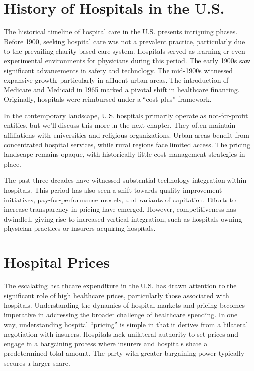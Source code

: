 \documentclass[
  letterpaper,
  DIV=11,
  numbers=noendperiod]{scrreport}
\theoremstyle{definition}
\theoremstyle{remark}
\begin{document}
\hypertarget{history-of-hospitals-in-the-u.s.}{%
\section{History of Hospitals in the
U.S.}\label{history-of-hospitals-in-the-u.s.}}

The historical timeline of hospital care in the U.S. presents intriguing
phases. Before 1900, seeking hospital care was not a prevalent practice,
particularly due to the prevailing charity-based care system. Hospitals
served as learning or even experimental environments for physicians
during this period. The early 1900s saw significant advancements in
safety and technology. The mid-1900s witnessed expansive growth,
particularly in affluent urban areas. The introduction of Medicare and
Medicaid in 1965 marked a pivotal shift in healthcare financing.
Originally, hospitals were reimbursed under a ``cost-plus'' framework.

In the contemporary landscape, U.S. hospitals primarily operate as
not-for-profit entities, but we'll discuss this more in the next
chapter. They often maintain affiliations with universities and
religious organizations. Urban areas benefit from concentrated hospital
services, while rural regions face limited access. The pricing landscape
remains opaque, with historically little cost management strategies in
place.

The past three decades have witnessed substantial technology integration
within hospitals. This period has also seen a shift towards quality
improvement initiatives, pay-for-performance models, and variants of
capitation. Efforts to increase transparency in pricing have emerged.
However, competitiveness has dwindled, giving rise to increased vertical
integration, such as hospitals owning physician practices or insurers
acquiring hospitals.

\hypertarget{hospital-prices}{%
\section{Hospital Prices}\label{hospital-prices}}

The escalating healthcare expenditure in the U.S. has drawn attention to
the significant role of high healthcare prices, particularly those
associated with hospitals. Understanding the dynamics of hospital
markets and pricing becomes imperative in addressing the broader
challenge of healthcare spending. In one way, understanding hospital
``pricing'' is simple in that it derives from a bilateral negotiation
with insurers. Hospitals lack unilateral authority to set prices and
engage in a bargaining process where insurers and hospitals share a
predetermined total amount. The party with greater bargaining power
typically secures a larger share.
\end{document}
